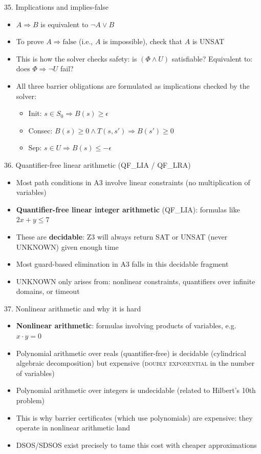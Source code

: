 \documentclass[aspectratio=169]{beamer}
\begin{document}
\begin{frame}{35. Implications and implies-false}
\begin{itemize}
  \item \(A \Rightarrow B\) is equivalent to \(\neg A \vee B\)
  \item To prove \(A \Rightarrow \text{false}\) (i.e., \(A\) is impossible), check that \(A\) is UNSAT
  \item This is how the solver checks safety: is \((\Phi \wedge U)\) satisfiable? Equivalent to: does \(\Phi \Rightarrow \neg U\) fail?
  \item All three barrier obligations are formulated as implications checked by the solver:
    \begin{itemize}
      \item Init: \(s \in S_0 \Rightarrow B(s) \ge \epsilon\)
      \item Consec: \(B(s)\ge0 \wedge T(s,s') \Rightarrow B(s')\ge0\)
      \item Sep: \(s \in U \Rightarrow B(s) \le -\epsilon\)
    \end{itemize}
\end{itemize}
\end{frame}

\begin{frame}{36. Quantifier-free linear arithmetic (QF\_LIA / QF\_LRA)}
\begin{itemize}
  \item Most path conditions in A3 involve linear constraints (no multiplication of variables)
  \item \textbf{Quantifier-free linear integer arithmetic} (QF\_LIA): formulas like \(2x + y \le 7\)
  \item These are \textbf{decidable}: Z3 will always return SAT or UNSAT (never UNKNOWN) given enough time
  \item Most guard-based elimination in A3 falls in this decidable fragment
  \item UNKNOWN only arises from: nonlinear constraints, quantifiers over infinite domains, or timeout
\end{itemize}
\end{frame}

\begin{frame}{37. Nonlinear arithmetic and why it is hard}
\begin{itemize}
  \item \textbf{Nonlinear arithmetic}: formulas involving products of variables, e.g.\ \(x \cdot y = 0\)
  \item Polynomial arithmetic over reals (quantifier-free) is decidable (cylindrical algebraic decomposition)
    but expensive (\textsc{doubly exponential} in the number of variables)
  \item Polynomial arithmetic over integers is undecidable (related to Hilbert's 10th problem)
  \item This is why barrier certificates (which use polynomials) are expensive: they operate in nonlinear
    arithmetic land
  \item DSOS/SDSOS exist precisely to tame this cost with cheaper approximations
\end{itemize}
\end{frame}
\end{document}
